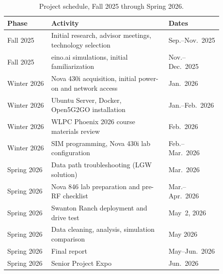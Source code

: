 \documentclass[
    left=1.5in,
    right=1.25in,
    top=1.25in,
    bottom=1.25in
]{CalPolySeniorProject}
\begin{document}

\begin{table}[!ht]
    \centering
    \caption[Project schedule]{Project schedule, Fall 2025 through Spring 2026.}
    \vspace{0.5\baselineskip}
    \begin{tabular}{p{0.18\linewidth}p{0.48\linewidth}p{0.22\linewidth}}
        \toprule
        \textbf{Phase} & \textbf{Activity} & \textbf{Dates} \\
        \midrule
        Fall 2025   & Initial research, advisor meetings, technology selection
                    & Sep.--Nov.\ 2025 \\
        \addlinespace
        Fall 2025   & eino.ai simulations, initial familiarization
                    & Nov.--Dec.\ 2025 \\
        \addlinespace
        Winter 2026 & Nova 430i acquisition, initial power-on and network access
                    & Jan.\ 2026 \\
        \addlinespace
        Winter 2026 & Ubuntu Server, Docker, Open5G2GO installation
                    & Jan.--Feb.\ 2026 \\
        \addlinespace
        Winter 2026 & WLPC Phoenix 2026 course materials review
                    & Feb.\ 2026 \\
        \addlinespace
        Winter 2026 & SIM programming, Nova 430i lab configuration
                    & Feb.--Mar.\ 2026 \\
        \addlinespace
        Spring 2026 & Data path troubleshooting (LGW solution)
                    & Mar.\ 2026 \\
        \addlinespace
        Spring 2026 & Nova 846 lab preparation and pre-RF checklist
                    & Mar.--Apr.\ 2026 \\
        \addlinespace
        Spring 2026 & Swanton Ranch deployment and drive test
                    & May~2, 2026 \\
        \addlinespace
        Spring 2026 & Data cleaning, analysis, simulation comparison
                    & May 2026 \\
        \addlinespace
        Spring 2026 & Final report
                    & May--Jun.\ 2026 \\
        \addlinespace
        Spring 2026 & Senior Project Expo
                    & Jun.\ 2026 \\
        \bottomrule
    \end{tabular}
    \label{tab:schedule}
\end{table}
\end{document}

